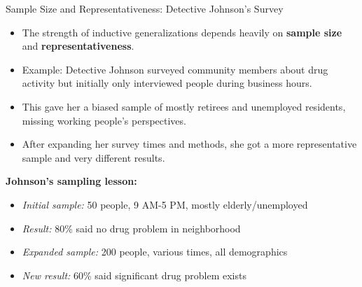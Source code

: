 \documentclass{beamer}
\begin{document}
\begin{frame}{Sample Size and Representativeness: Detective Johnson's Survey}
	\begin{itemize}
		\item The strength of inductive generalizations depends heavily on \textbf{sample size} and \textbf{representativeness}.
		\item Example: Detective Johnson surveyed community members about drug activity but initially only interviewed people during business hours.
		\item This gave her a biased sample of mostly retirees and unemployed residents, missing working people's perspectives.
		\item After expanding her survey times and methods, she got a more representative sample and very different results.
	\end{itemize}
	
	\begin{example}
		\scriptsize
		\textbf{Johnson's sampling lesson:}
		\begin{itemize}
			\item \textit{Initial sample:} 50 people, 9 AM-5 PM, mostly elderly/unemployed
			\item \textit{Result:} 80\% said no drug problem in neighborhood
			\item \textit{Expanded sample:} 200 people, various times, all demographics  
			\item \textit{New result:} 60\% said significant drug problem exists
		\end{itemize}
	\end{example}
\end{frame}
\end{document}
